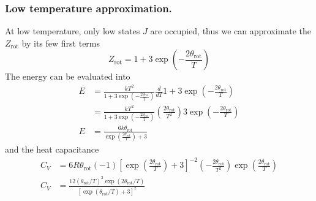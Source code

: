 \documentclass[../../../Main.tex]{subfiles}
\begin{document}
\subsubsection*{Low temperature approximation.} At low temperature, only low states $J$ are occupied, thus we can approximate the $Z_\text{rot}$ by its few first terms 
\begin{equation*}
    Z_\text{rot}=1+3\exp\left(-\frac{2\theta_\text{rot}}{T}\right)
\end{equation*}
The energy can be evaluated into 
\begin{align*}
    E&=\frac{kT^2}{1+3\exp\left(-\frac{2\theta_\text{rot}}{T}\right)}\frac{d}{dT}1+3\exp\left(-\frac{2\theta_\text{rot}}{T}\right)\\
    &=\frac{kT^2}{1+3\exp\left(-\frac{2\theta_\text{rot}}{T}\right)}\left(\frac{2\theta_\text{rot}}{T^2}\right)3\exp\left(-\frac{2\theta_\text{rot}}{T}\right)\\
    E&=\frac{6k\theta_\text{rot}}{\exp\left(\frac{2\theta_\text{rot}}{T}\right)+3}
\end{align*}
and the heat capacitance
\begin{align*}
    C_V&=6R\theta_\text{rot}(-1)\left[\exp\left(\frac{2\theta_\text{rot}}{T}\right)+3\right]^{-2}\left(-\frac{2\theta_\text{rot}}{T^2}\right)\exp\left(\frac{2\theta_\text{rot}}{T}\right)\\
    C_V&=\frac{12(\theta_\text{rot}/T)^2\exp(2\theta_\text{rot}/T)}{\left[\exp(\theta_\text{rot}/T)+3\right]^2}
\end{align*}
\end{document}
